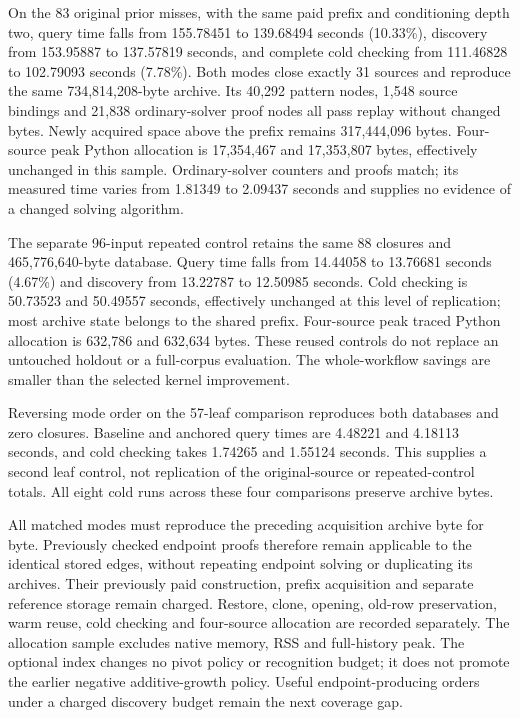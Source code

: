 \documentclass[11pt,a4paper]{article}
\numberwithin{equation}{section}
\theoremstyle{plain}
\theoremstyle{definition}
\theoremstyle{remark}
\begin{document}
On the 83 original prior misses, with the same paid prefix and conditioning depth two, query time falls from 155.78451 to 139.68494 seconds (10.33\%), discovery from 153.95887 to 137.57819 seconds, and complete cold checking from 111.46828 to 102.79093 seconds (7.78\%). Both modes close exactly 31 sources and reproduce the same 734,814,208-byte archive. Its 40,292 pattern nodes, 1,548 source bindings and 21,838 ordinary-solver proof nodes all pass replay without changed bytes. Newly acquired space above the prefix remains 317,444,096 bytes. Four-source peak Python allocation is 17,354,467 and 17,353,807 bytes, effectively unchanged in this sample. Ordinary-solver counters and proofs match; its measured time varies from 1.81349 to 2.09437 seconds and supplies no evidence of a changed solving algorithm.

The separate 96-input repeated control retains the same 88 closures and 465,776,640-byte database. Query time falls from 14.44058 to 13.76681 seconds (4.67\%) and discovery from 13.22787 to 12.50985 seconds. Cold checking is 50.73523 and 50.49557 seconds, effectively unchanged at this level of replication; most archive state belongs to the shared prefix. Four-source peak traced Python allocation is 632,786 and 632,634 bytes. These reused controls do not replace an untouched holdout or a full-corpus evaluation. The whole-workflow savings are smaller than the selected kernel improvement.

Reversing mode order on the 57-leaf comparison reproduces both databases and zero closures. Baseline and anchored query times are 4.48221 and 4.18113 seconds, and cold checking takes 1.74265 and 1.55124 seconds. This supplies a second leaf control, not replication of the original-source or repeated-control totals. All eight cold runs across these four comparisons preserve archive bytes.

All matched modes must reproduce the preceding acquisition archive byte for byte. Previously checked endpoint proofs therefore remain applicable to the identical stored edges, without repeating endpoint solving or duplicating its archives. Their previously paid construction, prefix acquisition and separate reference storage remain charged. Restore, clone, opening, old-row preservation, warm reuse, cold checking and four-source allocation are recorded separately. The allocation sample excludes native memory, RSS and full-history peak. The optional index changes no pivot policy or recognition budget; it does not promote the earlier negative additive-growth policy. Useful endpoint-producing orders under a charged discovery budget remain the next coverage gap.
\end{document}
